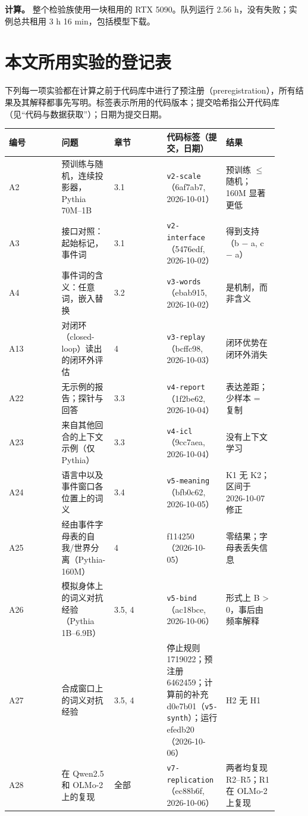 \documentclass[UTF8,fontset=none,a4paper]{ctexart}
\begin{document}
\textbf{计算。} 整个检验族使用一块租用的 RTX 5090。队列运行 2.56 h，没有失败；实例总共租用 3 h 16 min，包括模型下载。

\section{本文所用实验的登记表}

下列每一项实验都在计算之前于代码库中进行了预注册（preregistration），所有结果及其解释都事先写明。标签表示所用的代码版本；提交哈希指公开代码库（见``代码与数据获取''）；日期为提交日期。

\begin{center}\small\begin{tabular}{p{0.18\linewidth} p{0.18\linewidth} p{0.18\linewidth} p{0.18\linewidth} p{0.18\linewidth}}\hline
\textbf{编号} & \textbf{问题} & \textbf{章节} & \textbf{代码标签（提交，日期）} & \textbf{结果} \\ \hline
A2 & 预训练与随机，连续投影器，Pythia \mbox{70M--1B} & 3.1 & \texttt{v2-scale}（6af7ab7, \mbox{2026-10-01}） & 预训练 $\le$ 随机；160M 显著更低 \\
A3 & 接口对照：起始标记，事件词 & 3.1 & \texttt{v2-interface}（5476edf, \mbox{2026-10-02}） & 得到支持（b $-$ a, c $-$ a） \\
A4 & 事件词的含义：任意词，嵌入替换 & 3.2 & \texttt{v3-words}（ebab915, \mbox{2026-10-02}） & 是机制，而非含义 \\
A13 & 对闭环（\mbox{closed-loop}）读出的闭环外评估 & 4 & \texttt{v3-replay}（bcffc98, \mbox{2026-10-03}） & 闭环优势在闭环外消失 \\
A22 & 无示例的报告；探针与回答 & 3.3 & \texttt{v4-report}（1f2be62, \mbox{2026-10-04}） & 表达差距；少样本 = 复制 \\
A23 & 来自其他回合的上下文示例（仅 Pythia） & 3.3 & \texttt{v4-icl}（9cc7aea, \mbox{2026-10-04}） & 没有上下文学习 \\
A24 & 语言中以及事件窗口各位置上的词义 & 3.4 & \texttt{v5-meaning}（bfb0c62, \mbox{2026-10-05}） & K1 无 K2；区间于 \mbox{2026-10-07} 修正 \\
A25 & 经由事件字母表的自我/世界分离（\mbox{Pythia-160M}） & 4 & f114250（\mbox{2026-10-05}） & 零结果；字母表丢失信息 \\
A26 & 模拟身体上的词义对抗经验（Pythia \mbox{1B--6.9B}） & 3.5, 4 & \texttt{v5-bind}（ac18bce, \mbox{2026-10-06}） & 形式上 B > 0，事后由频率解释 \\
A27 & 合成窗口上的词义对抗经验 & 3.5, 4 & 停止规则 1719022；预注册 6462459；计算前的补充 d0e7b01（\texttt{v5-synth}）；运行 efedb20（\mbox{2026-10-06}） & H2 无 H1 \\
A28 & 在 Qwen2.5 和 \mbox{OLMo-2} 上的复现 & 全部 & \texttt{v7-replication}（ec88b6f, \mbox{2026-10-06}） & 两者均复现 \mbox{R2--R5}；R1 在 \mbox{OLMo-2} 上复现 \\
\hline\end{tabular}\end{center}
\end{document}
